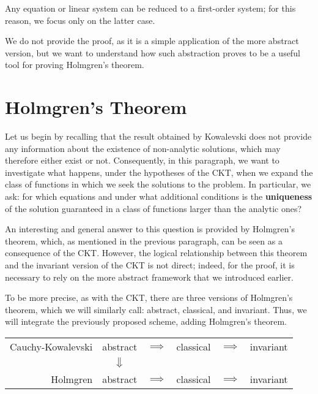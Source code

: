 \begin{remark}
Any equation or linear system can be reduced to a first-order system; for this reason, we focus only on the latter case.
\end{remark}

We do not provide the proof, as it is a simple application of the more abstract version, but we want to understand how such abstraction proves to be a useful tool for proving Holmgren's theorem.


\newpage
\section{Holmgren's Theorem}

Let us begin by recalling that the result obtained by Kowalevski does not provide any information about the existence of non-analytic solutions, which may therefore either exist or not. Consequently, in this paragraph, we want to investigate what happens, under the hypotheses of the CKT, when we expand the class of functions in which we seek the solutions to the problem. In particular, we ask: for which equations and under what additional conditions is the \textbf{uniqueness} of the solution guaranteed in a class of functions larger than the analytic ones?

An interesting and general answer to this question is provided by Holmgren's theorem, which, as mentioned in the previous paragraph, can be seen as a consequence of the CKT. However, the logical relationship between this theorem and the invariant version of the CKT is not direct; indeed, for the proof, it is necessary to rely on the more abstract framework that we introduced earlier.

To be more precise, as with the CKT, there are three versions of Holmgren's theorem, which we will similarly call: abstract, classical, and invariant. Thus, we will integrate the previously proposed scheme, adding Holmgren's theorem.

\begin{center}
\renewcommand{\arraystretch}{1.5}
\begin{tabular}{r||ccccc} 
Cauchy-Kowalevski & abstract & $\implies$  & classical & $\implies$ & invariant\\
&$\big\Downarrow$ &&&&\\
Holmgren & abstract & $\implies$ & classical & $\implies$ & invariant\\
\end{tabular}
\end{center}

